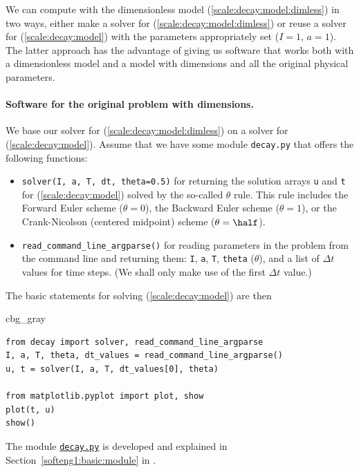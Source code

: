 \documentclass[graybox,envcountchap,sectrefs,final]{svmonodo}
\newenvironment{_cod_tight}[1]{
   \def\FrameCommand{\colorbox{#1}}
   \FrameRule0.6pt\MakeFramed {\FrameRestore}\vskip3mm}
   {\vskip0mm\endMakeFramed}
\newenvironment{cod}[1]{
\bgroup\rmfamily
\fboxsep=0mm\relax
\begin{_cod_tight}{#1}
\list{}{\parsep=-2mm\parskip=0mm\topsep=0pt\leftmargin=2mm
\rightmargin=2\leftmargin\leftmargin=4pt\relax}
\item\relax}
{\endlist\end{_cod_tight}\egroup}
\begin{document}
We can compute with the dimensionless model (\ref{scale:decay:model:dimless})
in two ways, either make a solver for (\ref{scale:decay:model:dimless})
or reuse a solver for (\ref{scale:decay:model}) with the parameters
appropriately set ($I=1$, $a=1$).
The latter approach has the advantage of giving us
software that works both with a dimensionless model and a model
with dimensions and all the original physical parameters.

\paragraph{Software for the original problem with dimensions.}
We base our solver for
(\ref{scale:decay:model:dimless}) on a solver for (\ref{scale:decay:model}).
Assume that we have some module \texttt{decay.py} that offers the following
functions:

\begin{itemize}
  \item \texttt{solver(I, a, T, dt, theta=0.5)} for returning the solution arrays
    \texttt{u} and \texttt{t} for (\ref{scale:decay:model}) solved by the so-called
    $\theta$ rule. This rule includes the Forward Euler scheme ($\theta=0$),
    the Backward Euler scheme ($\theta=1$), or the Crank-Nicolson
    (centered midpoint) scheme ($\theta=\half$).

  \item \Verb!read_command_line_argparse()! for reading parameters in the problem
    from the command line and returning them: \texttt{I}, \texttt{a}, \texttt{T}, \texttt{theta} ($\theta$),
    and a list of $\Delta t$ values for time steps. (We shall only make
    use of the first $\Delta t$ value.)
\end{itemize}

\noindent
The basic statements for solving (\ref{scale:decay:model}) are
then

\begin{cod}{cbg_gray}\begin{Verbatim}[numbers=none,fontsize=\fontsize{9pt}{9pt},baselinestretch=0.95,xleftmargin=2mm]
from decay import solver, read_command_line_argparse
I, a, T, theta, dt_values = read_command_line_argparse()
u, t = solver(I, a, T, dt_values[0], theta)

from matplotlib.pyplot import plot, show
plot(t, u)
show()
\end{Verbatim}
\end{cod}
\noindent
The module \href{{http://tinyurl.com/o8pb3yy/decay.py}}{\nolinkurl{decay.py}} is developed
and explained in
Section~\ref{softeng1:basic:module} in \cite{Langtangen_decay}.
\end{document}
